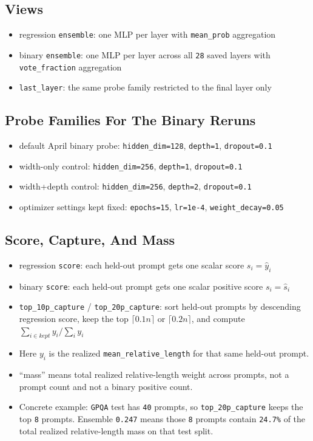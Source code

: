 \documentclass[11pt]{article}
\begin{document}
\subsection*{Views}
\begin{itemize}[leftmargin=1.5em]
\item regression \texttt{ensemble}: one MLP per layer with \texttt{mean\_prob} aggregation
\item binary \texttt{ensemble}: one MLP per layer across all \texttt{28} saved layers with \texttt{vote\_fraction} aggregation
\item \texttt{last\_layer}: the same probe family restricted to the final layer only
\end{itemize}

\subsection*{Probe Families For The Binary Reruns}
\begin{itemize}[leftmargin=1.5em]
\item default April binary probe: \texttt{hidden\_dim=128}, \texttt{depth=1}, \texttt{dropout=0.1}
\item width-only control: \texttt{hidden\_dim=256}, \texttt{depth=1}, \texttt{dropout=0.1}
\item width+depth control: \texttt{hidden\_dim=256}, \texttt{depth=2}, \texttt{dropout=0.1}
\item optimizer settings kept fixed: \texttt{epochs=15}, \texttt{lr=1e-4}, \texttt{weight\_decay=0.05}
\end{itemize}

\subsection*{Score, Capture, And Mass}
\begin{itemize}[leftmargin=1.5em]
\item regression \texttt{score}: each held-out prompt gets one scalar score \texttt{$s_i = \hat y_i$}
\item binary \texttt{score}: each held-out prompt gets one scalar positive score \texttt{$s_i = \hat s_i$}
\item \texttt{top\_10p\_capture} / \texttt{top\_20p\_capture}: sort held-out prompts by descending regression score, keep the top \texttt{$\lceil 0.1n \rceil$} or \texttt{$\lceil 0.2n \rceil$}, and compute \texttt{$\sum_{i \in kept} y_i / \sum_i y_i$}
\item Here \texttt{$y_i$} is the realized \texttt{mean\_relative\_length} for that same held-out prompt.
\item ``mass'' means total realized relative-length weight across prompts, not a prompt count and not a binary positive count.
\item Concrete example: \texttt{GPQA} test has \texttt{40} prompts, so \texttt{top\_20p\_capture} keeps the top \texttt{8} prompts. Ensemble \texttt{0.247} means those \texttt{8} prompts contain \texttt{24.7\%} of the total realized relative-length mass on that test split.
\end{itemize}
\end{document}
